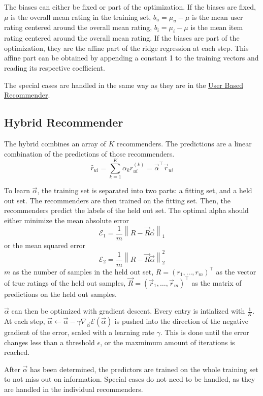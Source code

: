 \documentclass[12pt]{scrartcl}
\newcommand{\norm}[1]{\left\| #1 \right\|}
\def\T{\top}
\begin{document}
The biases can either be fixed or part of the optimization.
If the biases are fixed, $\mu$ is the overall mean rating in the training set, $b_u = \mu_u - \mu$ is the mean user rating centered around the overall mean rating, $b_i = \mu_i - \mu$ is the mean item rating centered around the overall mean rating.
If the biases are part of the optimization, they are the affine part of the ridge regression at each step.
This affine part can be obtained by appending a constant 1 to the training vectors and reading its respective coefficient.

The special cases are handled in the same way as they are in the \hyperlink{special_cases}{User Based Recommender}.

\subsection[Hybrid]{Hybrid Recommender}
The hybrid combines an array of $K$ recommenders. The predictions are a linear combination of the predictions of those recommenders.
$$\hat{r}_{ui} = \sum\limits_{k = 1}^{K} \alpha_k \hat{r}^{(k)}_{ui} = \vec{\alpha}^\T \vec{r}_{ui}$$

To learn $\vec{\alpha}$, the training set is separated into two parts: a fitting set, and a held out set.
The recommenders are then trained on the fitting set.
Then, the recommenders predict the labels of the held out set.
The optimal alpha should either minimize the mean absolute error
$$\mathcal{E}_1 = \frac{1}{m}\norm{R - \vec{R} \vec{\alpha} }_1$$
or the mean squared error
$$\mathcal{E}_2 = \frac{1}{m}\norm{R - \vec{R} \vec{\alpha}}^2_2$$
$m$ as the number of samples in the held out set,
$R = (r_1, \dots, r_m)^\T$ as the vector of true ratings of the held out samples,
$\vec{R} = (\vec{r}_1, \dots, \vec{r}_m)^\T$ as the matrix of predictions on the held out samples.

$\vec{\alpha}$ can then be optimized with gradient descent. Every entry is intialized with $\frac{1}{K}$.
At each step, $\vec{\alpha} \gets \vec{\alpha} - \gamma \nabla_{\vec{\alpha}}\mathcal{E}(\vec{\alpha})$ is pushed into the direction of the negative gradient of the error, scaled with a learning rate $\gamma$.
This is done until the error changes less than a threshold $\epsilon$, or the maxmimum amount of iterations is reached.

After $\vec{\alpha}$ has been determined, the predictors are trained on the whole training set to not miss out on information.
Special cases do not need to be handled, as they are handled in the individual recommenders.
\end{document}

